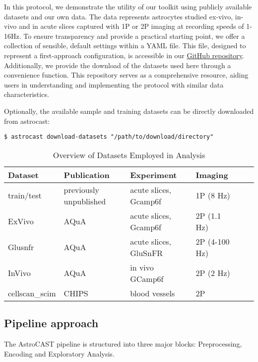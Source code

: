 In this protocol, we demonstrate the utility of our toolkit using publicly available datasets and our own data. The data represents astrocytes studied ex-vivo, in-vivo and in acute slices captured with \ac{1P} or \ac{2P} imaging at recording speeds of 1-16Hz. To ensure transparency and provide a practical starting point, we offer a collection of sensible, default settings within a YAML file. This file, designed to represent a first-approach configuration, is accessible in our \href{https://github.com/janreising/astroCAST}{GitHub repository}. Additionally, we provide the download of the datasets used here through a convenience function. This repository serves as a comprehensive resource, aiding users in understanding and implementing the protocol with similar data characteristics.


Optionally, the available sample and training datasets can be directly downloaded from astrocast:
\begin{lstlisting}[style=bashStyle]
    $ astrocast download-datasets "/path/to/download/directory"
\end{lstlisting}


\begin{table}[ht]
    \centering
    \caption{Overview of Datasets Employed in Analysis}
    \begin{tabular}{|l|l|l|l|l|l|}
        \hline
        \textbf{Dataset} & \textbf{Publication} & \textbf{Experiment} & \textbf{Imaging} \\ \hline
        train/test & previously unpublished & acute slices, Gcamp6f & \ac{1P} (8 Hz) \\ \hline
        ExVivo & AQuA\citep{wang_event-based_2018} & acute slices, Gcamp6f & \ac{2P} (1.1 Hz) \\ \hline
        Glusnfr & AQuA\citep{wang_event-based_2018} & acute slices, GluSnFR & \ac{2P} (4-100 Hz) \\ \hline
        InVivo & AQuA\citep{wang_event-based_2018} & in vivo GCamp6f & \ac{2P} (2 Hz) \\ \hline
        cellscan\_scim & CHIPS\citep{barrett_chips_2018} & blood vessels & \ac{2P} \\ \hline
    \end{tabular}
\end{table}

\subsection{Pipeline approach}
The AstroCAST pipeline is structured into three major blocks: Preprocessing, Encoding and Exploratory Analysis.

